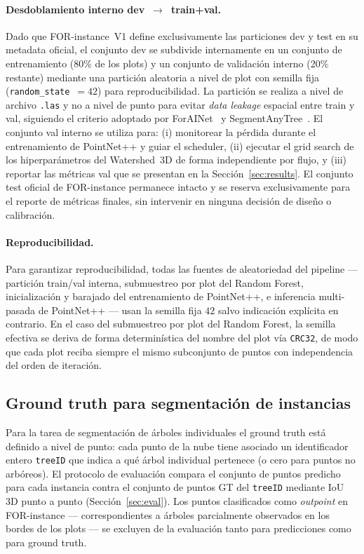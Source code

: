 \documentclass[runningheads]{llncs}
\begin{document}
\paragraph{Desdoblamiento interno dev~$\rightarrow$~train+val.}
Dado que FOR-instance~V1 define exclusivamente las particiones dev y test en su metadata oficial, el conjunto dev se subdivide internamente en un conjunto de entrenamiento (80\% de los plots) y un conjunto de validaci\'on interno (20\% restante) mediante una partici\'on aleatoria a nivel de plot con semilla fija (\texttt{random\_state}~$= 42$) para reproducibilidad. La partici\'on se realiza a nivel de archivo \texttt{.las} y no a nivel de punto para evitar \emph{data leakage} espacial entre train y val, siguiendo el criterio adoptado por ForAINet~\cite{henrich2024} y SegmentAnyTree~\cite{wielgosz2024}. El conjunto val interno se utiliza para: (i) monitorear la p\'erdida durante el entrenamiento de PointNet++ y guiar el scheduler, (ii) ejecutar el grid search de los hiperpar\'ametros del Watershed~3D de forma independiente por flujo, y (iii) reportar las m\'etricas val que se presentan en la Secci\'on~\ref{sec:results}. El conjunto test oficial de FOR-instance permanece intacto y se reserva exclusivamente para el reporte de m\'etricas finales, sin intervenir en ninguna decisi\'on de dise\~no o calibraci\'on.

\paragraph{Reproducibilidad.}
Para garantizar reproducibilidad, todas las fuentes de aleatoriedad del pipeline --- partici\'on train/val interna, submuestreo por plot del Random Forest, inicializaci\'on y barajado del entrenamiento de PointNet++, e inferencia multi-pasada de PointNet++ --- usan la semilla fija $42$ salvo indicaci\'on expl\'icita en contrario. En el caso del submuestreo por plot del Random Forest, la semilla efectiva se deriva de forma determin\'istica del nombre del plot v\'ia \texttt{CRC32}, de modo que cada plot reciba siempre el mismo subconjunto de puntos con independencia del orden de iteraci\'on.

\subsection{Ground truth para segmentaci\'on de instancias}

Para la tarea de segmentaci\'on de \'arboles individuales el ground truth est\'a definido a nivel de punto: cada punto de la nube tiene asociado un identificador entero \texttt{treeID} que indica a qu\'e \'arbol individual pertenece (o cero para puntos no arb\'oreos). El protocolo de evaluaci\'on compara el conjunto de puntos predicho para cada instancia contra el conjunto de puntos GT del \texttt{treeID} mediante IoU 3D punto a punto (Secci\'on~\ref{sec:eval}). Los puntos clasificados como \emph{outpoint} en FOR-instance --- correspondientes a \'arboles parcialmente observados en los bordes de los plots --- se excluyen de la evaluaci\'on tanto para predicciones como para ground truth.
\end{document}
